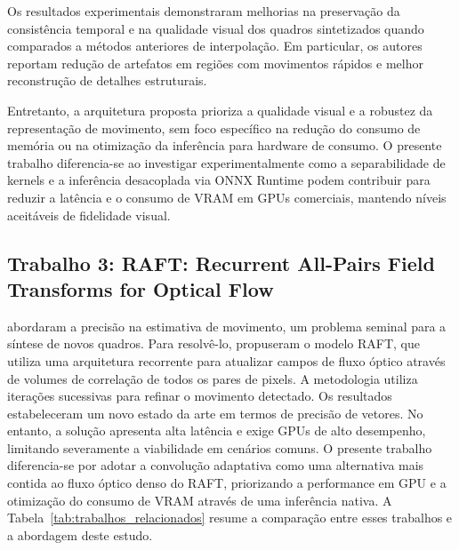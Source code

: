 \documentclass[
    12pt,                %
    openright,           %
    oneside,             %
    a4paper,             %
    english,             %
    brazil               %
]{abntex2}
\begin{document}
Os resultados experimentais demonstraram melhorias na preservação da consistência temporal e na qualidade visual dos quadros sintetizados quando comparados a métodos anteriores de interpolação. Em particular, os autores reportam redução de artefatos em regiões com movimentos rápidos e melhor reconstrução de detalhes estruturais.

Entretanto, a arquitetura proposta prioriza a qualidade visual e a robustez da representação de movimento, sem foco específico na redução do consumo de memória ou na otimização da inferência para hardware de consumo. O presente trabalho diferencia-se ao investigar experimentalmente como a separabilidade de kernels e a inferência desacoplada via ONNX Runtime podem contribuir para reduzir a latência e o consumo de VRAM em GPUs comerciais, mantendo níveis aceitáveis de fidelidade visual.


\subsection{Trabalho 3: RAFT: Recurrent All-Pairs Field Transforms for Optical Flow}

 abordaram a precisão na estimativa de movimento, um problema seminal para a síntese de novos quadros. Para resolvê-lo, propuseram o modelo RAFT, que utiliza uma arquitetura recorrente para atualizar campos de fluxo óptico através de volumes de correlação de todos os pares de pixels. A metodologia utiliza iterações sucessivas para refinar o movimento detectado. Os resultados estabeleceram um novo estado da arte em termos de precisão de vetores. No entanto, a solução apresenta alta latência e exige GPUs de alto desempenho, limitando severamente a viabilidade em cenários comuns. O presente trabalho diferencia-se por adotar a convolução adaptativa como uma alternativa mais contida ao fluxo óptico denso do RAFT, priorizando a performance em GPU e a otimização do consumo de VRAM através de uma inferência nativa. A Tabela~\ref{tab:trabalhos_relacionados} resume a comparação entre esses trabalhos e a abordagem deste estudo.

\vspace{0.5cm}
\end{document}
